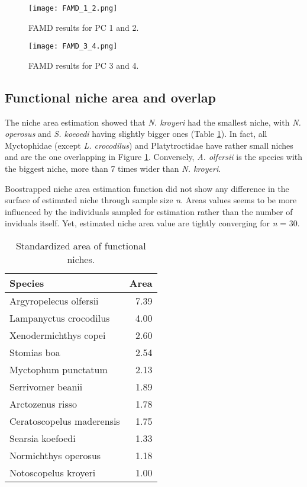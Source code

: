 \begin{figure} [!htbp]
	\begin{center}
		\texttt{[image: FAMD\_1\_2.png]}
	\end{center}
	\caption{FAMD results for PC 1 and 2.}
	\label{fig:famd12}
\end{figure}

\begin{figure} [!htbp]
	\begin{center}
		\texttt{[image: FAMD\_3\_4.png]}
	\end{center}
	\caption{FAMD results for PC 3 and 4.}
	\label{fig:famd34}
\end{figure}


\subsection{Functional niche area and overlap}
The niche area estimation showed that \textit{N. kroyeri} had the smallest niche, with \textit{N. operosus} and \textit{S. koeoedi} having slightly bigger ones (Table \ref{table:sp_area}). In fact, all Myctophidae (except \textit{L. crocodilus}) and Platytroctidae have rather small niches and are the one overlapping in Figure \ref{fig:famd12}. Conversely, \textit{A. olfersii} is the species with the biggest niche, more than 7 times wider than \textit{N. kroyeri}.

Boostrapped niche area estimation function did not show any difference in the surface of estimated niche through sample size \textit{n}. Areas values seems to be more influenced by the individuals sampled for estimation rather than the number of inviduals itself. Yet, estimated niche area value are tightly converging for \textit{n} = 30. 

\begin{table}[!htbp]
\centering
\caption{Standardized area of functional niches.}
\label{table:sp_area}
\begin{adjustbox}{max width=1.1\textwidth,center}
\begin{tabular}{lr}
  \hline
Species & Area \\ 
  \hline
Argyropelecus olfersii & 7.39 \\ 
  Lampanyctus crocodilus & 4.00 \\ 
  Xenodermichthys copei & 2.60 \\ 
  Stomias boa & 2.54 \\ 
  Myctophum punctatum & 2.13 \\ 
  Serrivomer beanii & 1.89 \\ 
  Arctozenus risso & 1.78 \\ 
  Ceratoscopelus maderensis & 1.75 \\ 
  Searsia koefoedi & 1.33 \\ 
  Normichthys operosus & 1.18 \\ 
  Notoscopelus kroyeri & 1.00 \\ 
   \hline
\end{tabular}
\end{adjustbox}
\end{table}

